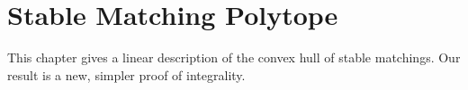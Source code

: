 \chapter{Stable Matching Polytope}
This chapter gives a linear description of the convex hull of stable matchings. Our result is a new, simpler proof of integrality.
